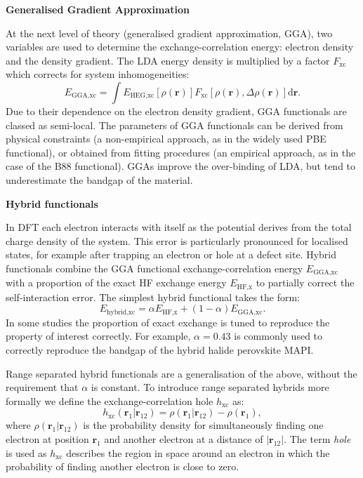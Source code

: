 \textbf{Generalised Gradient Approximation}

At the next level of theory (generalised gradient approximation, GGA), two variables are used to determine the exchange-correlation energy: electron density and the density gradient. The LDA energy density is multiplied by a factor $F_\textrm{xc}$ which corrects for system inhomogeneities:\autocite{Henderson2008}
\begin{equation}
E_{\textrm{GGA,xc}} = \int  E_{\textrm{HEG,xc}}\left[\rho\left(\textbf{r}\right)\right]F_\textrm{xc}\left[\rho\left(\textbf{r}\right),\Delta\rho\left(\textbf{r}\right)\right]\textrm{d}\mathbf{r}.
\end{equation}
Due to their dependence on the electron density gradient, GGA functionals are classed as semi-local. The parameters of GGA functionals can be derived from physical constraints (a non-empirical approach, as in the widely used PBE functional), or obtained from fitting procedures (an empirical approach, as in the case of the B88 functional). GGAs improve the over-binding of LDA, but tend to underestimate the bandgap of the material.

\textbf{Hybrid functionals} 

In DFT each electron interacts with itself as the potential derives from the total charge density of the system. This error is particularly pronounced for localised states, for example after trapping an electron or hole at a defect site. Hybrid functionals combine the GGA functional exchange-correlation energy $E_{\textrm{GGA,xc}}$ with a proportion of the exact HF exchange energy $E_{\textrm{HF,x}}$ to partially correct the self-interaction error. The simplest hybrid functional takes the form:\autocite{Henderson2008}
\begin{equation} \label{simplehybrid}
E_{\textrm{hybrid,xc}} = \alpha E_{\textrm{HF,x}} + \left(1-\alpha\right)E_{\textrm{GGA,xc}}.
\end{equation}
In some studies the proportion of exact exchange is tuned to reproduce the property of interest correctly. For example, $\alpha=0.43$ is commonly used to correctly reproduce the bandgap of the hybrid halide perovskite MAPI.\autocite{Whalley2017} %

Range separated hybrid functionals are a generalisation of the above, without the requirement that $\alpha$ is constant.
To introduce range separated hybrids more formally we define the exchange-correlation hole $h_\mathrm{xc}$ as:
\begin{equation}
h_\mathrm{xc}(\mathbf{r}_1|\mathbf{r}_{12}) = \rho(\mathbf{r}_1|\mathbf{r}_{12})-\rho(\mathbf{r}_1),
\end{equation}
where $\rho(\mathbf{r}_1|\mathbf{r}_{12})$ is the probability density for simultaneously finding one electron at position $\mathbf{r}_1$ and another electron at a distance of $|\mathbf{r}_{12}|$.
The term \textit{hole} is used as $h_\mathrm{xc}$ describes the region in space around an electron in which the probability of finding another electron is close to zero.

